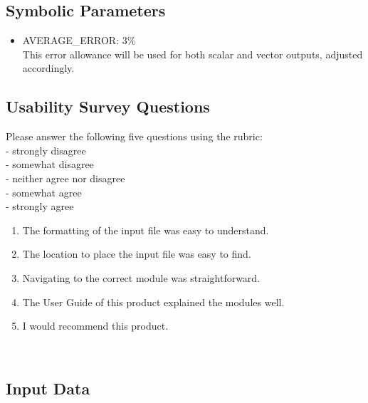 \documentclass[12pt, titlepage]{article}
\begin{document}
\subsection{Symbolic Parameters}
\label{symbolpara}
\begin{itemize}

\item[\label{Cons_AVERAGE_ERROR}]AVERAGE\_ERROR: 3\%\\This error allowance will be used for both scalar and vector outputs, adjusted accordingly.

\end{itemize}

\subsection{Usability Survey Questions}
\label{usabilitysurevyquestions}
Please answer the following five questions using the rubric:\\
\linebreak
{} - strongly disagree\\
 - somewhat disagree\\
 - neither agree nor disagree\\
 - somewhat agree\\
 - strongly agree\\

\begin{enumerate}
\item The formatting of the input file was easy to understand.
\item The location to place the input file was easy to find.
\item Navigating to the correct module was straightforward.
\item The User Guide of this product explained the modules well.
\item I would recommend this product.
\end{enumerate}

~\newpage
\subsection{Input Data}
\label{inputdata}
\end{document}
